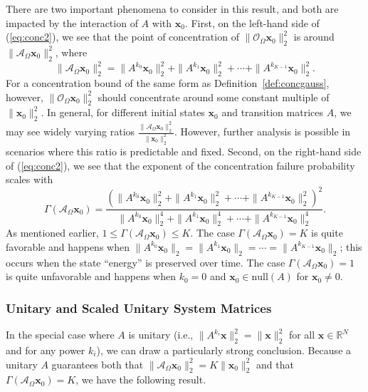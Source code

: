 \documentclass[11pt,draftcls,onecolumn]{IEEEtran}
\def\real    { \mathbb{R} }
\def \ok {{\mathcal{O}_{\Omega}}}
\def \ak {{\mathcal{A}_{\Omega}}}
\newcommand{\vc}[1]{\boldsymbol{#1}}
\def\real    { \mathbb{R} }
\begin{document}
There are two important phenomena to consider in this result, and both are impacted by the interaction of $A$ with $\vc{x}_0$.
First, on the left-hand side of (\ref{eq:conc2}), we see that the point of concentration of $\|\ok \vc{x}_0 \|_{2}^{2}$ is around $\|\ak \vc{x}_0\|_2^2$, where
\begin{equation}
\|\ak \vc{x}_0\|_2^2 =\|A^{k_0}\vc{x}_0\|_2^2 + \|A^{k_1} \vc{x}_{0}\|_2^2 + \cdots + \|A^{k_{K-1}} \vc{x}_0\|_2^2.
\label{eq:ak_x_0_sum}
\end{equation}
For a concentration bound of the same form as Definition~\ref{def:concgauss}, however, $\|\ok \vc{x}_0 \|_{2}^{2}$ should concentrate around some constant multiple of $\|\vc{x}_0\|_2^2$. In general, for different initial states $\vc{x}_0$ and transition matrices $A$, we may see widely varying ratios $\frac{\|\ak \vc{x}_0\|_2^2}{\|\vc{x}_0\|_2^2}$. However, further analysis is possible in scenarios where this ratio is predictable and fixed.
Second, on the right-hand side of (\ref{eq:conc2}), we see that the exponent of the concentration failure probability scales with
\begin{equation}
\Gamma\left(\ak \vc{x}_0\right) = \frac{\left( \|A^{k_0}\vc{x}_0\|_2^2 + \|A^{k_1} \vc{x}_{0}\|_2^2 + \cdots + \|A^{k_{K-1}} \vc{x}_0\|_2^2\right)^2}{\|A^{k_0}\vc{x}_0\|_2^4 + \|A^{k_1} \vc{x}_{0}\|_2^4 + \cdots + \|A^{k_{K-1}} \vc{x}_0\|_2^4}.
\label{eq:gamma1}
\end{equation}
As mentioned earlier, $1 \leq  \Gamma\left(\ak \vc{x}_0\right) \leq K$. The case $ \Gamma\left(\ak \vc{x}_0\right) = K$ is quite favorable and happens when $\|A^{k_0}\vc{x}_0\|_2 = \|A^{k_1} \vc{x}_0 \|_2 = \cdots = \|A^{k_{K-1}} \vc{x}_0 \|_2$; this occurs when the state ``energy'' is preserved over time. The case $ \Gamma\left(\ak \vc{x}_0\right) = 1$ is quite unfavorable and happens when $k_0 = 0$ and $\vc{x}_0 \in \mathrm{null}(A)$ for $\vc{x}_0 \neq 0$.




\subsubsection{Unitary and Scaled Unitary System Matrices}
\label{sec:unitary1}

In the special case where $A$ is unitary (i.e., $\| A^{k_i} \vc{x} \|_2^2 = \|\vc{x}\|_2^2$ for all $\vc{x} \in \real^N$ and for any power $k_i$), we can draw a particularly strong conclusion. Because a unitary $A$ guarantees both that $\|\ak \vc{x}_0\|_2^2  = K\|\vc{x}_0\|_2^2$ and that $ \Gamma\left(\ak \vc{x}_0\right) = K$, we have the following result.
\end{document}
